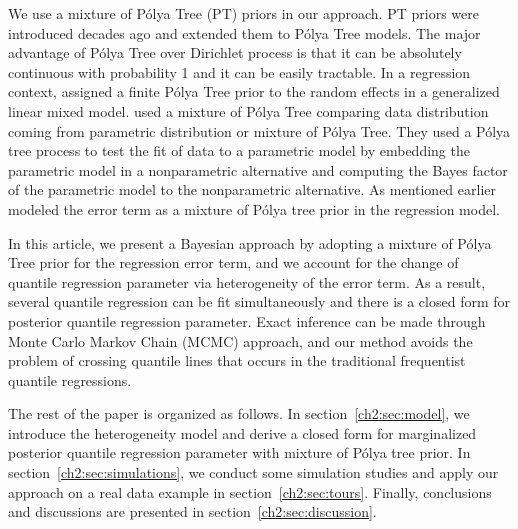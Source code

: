 \documentclass[12pt]{article}
\newcommand{\polya}{P\'{o}lya}
\begin{document}
We use a mixture of \polya{} Tree (PT) priors in our approach. PT
priors were introduced decades ago \citep{freedman1963, fabius1964,
  ferguson1974} and \citet{lavine1992, lavine1994} extended them to
\polya{} Tree models. The major advantage of \polya{} Tree over
Dirichlet process is that it can be absolutely continuous with
probability 1 and it can be easily tractable. In a regression context,
\citet{walker1997, walker1999} assigned a finite \polya{} Tree prior
to the random effects in a generalized linear mixed
model. \citet{berger2001} used a mixture of \polya{} Tree comparing
data distribution coming from parametric distribution or mixture of
\polya{} Tree. They used a \polya{} tree process to test the fit of
data to a parametric model by embedding the parametric model in a
nonparametric alternative and computing the Bayes factor of the
parametric model to the nonparametric alternative.  As mentioned
earlier \citet{hanson2002} modeled the error term as a mixture of
\polya{} tree prior in the regression model.


In this article, we present a Bayesian approach by adopting a mixture
of \polya{} Tree prior for the regression error term, and we account
for the change of quantile regression parameter via heterogeneity of
the error term. As a result, several quantile regression can be fit
simultaneously and there is a closed form for posterior quantile
regression parameter. Exact inference can be made through Monte Carlo
Markov Chain (MCMC) approach, and our method avoids the problem of
crossing quantile lines that occurs in the traditional frequentist
quantile regressions.

The rest of the paper is organized as follows. In
section~\ref{ch2:sec:model}, we introduce the heterogeneity model and
derive a closed form for marginalized posterior quantile regression
parameter with mixture of \polya{} tree prior.  In
section~\ref{ch2:sec:simulations}, we conduct some simulation studies and
apply our approach on a real data example in
section~\ref{ch2:sec:tours}. Finally, conclusions and discussions are
presented in section~\ref{ch2:sec:discussion}.
\end{document}
